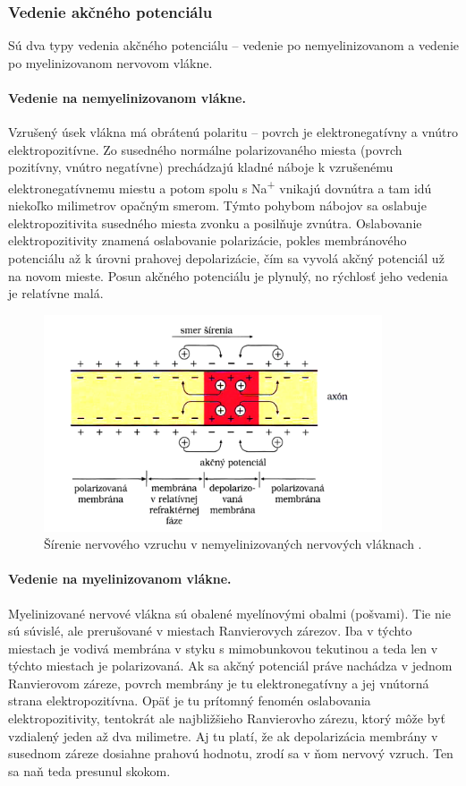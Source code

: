 \subsubsection{Vedenie akčného potenciálu}

Sú dva typy vedenia akčného potenciálu {--} vedenie po nemyelinizovanom a vedenie po myelinizovanom nervovom vlákne.

\paragraph{Vedenie na nemyelinizovanom vlákne.} 
Vzrušený úsek vlákna má obrátenú polaritu {--} povrch je elektronegatívny a vnútro elektropozitívne. Zo susedného normálne polarizovaného miesta (povrch pozitívny, vnútro negatívne) prechádzajú
kladné náboje k vzrušenému elektronegatívnemu miestu a potom spolu s Na\textsuperscript{+} vnikajú dovnútra a tam idú niekoľko milimetrov opačným smerom. Týmto pohybom nábojov sa oslabuje 
elektropozitivita susedného miesta zvonku a posilňuje zvnútra. Oslabovanie elektropozitivity znamená oslabovanie polarizácie, pokles membránového potenciálu až k úrovni prahovej depolarizácie,
čím sa vyvolá akčný potenciál už na novom mieste. Posun akčného potenciálu je plynulý, no rýchlosť jeho vedenia je relatívne malá.

\begin{figure}[!htbp]
  \centering
  \includegraphics[width=10cm]{img/nemyelin-clr.png}
  \caption{Šírenie nervového vzruchu v nemyelinizovaných nervových vláknach \cite{javorkaLekarskaFyziologiaUcebnica2001}.}
  \label{nemyelin}
\end{figure}

\paragraph{Vedenie na myelinizovanom vlákne.}
Myelinizované nervové vlákna sú obalené myelínovými obalmi (pošvami). Tie nie sú súvislé, ale prerušované v miestach Ranvierovych zárezov. Iba v týchto miestach je vodivá membrána v styku s mimobunkovou 
tekutinou a teda len v týchto miestach je polarizovaná. Ak sa akčný potenciál práve nachádza v jednom Ranvierovom záreze, povrch membrány je tu elektronegatívny a jej vnútorná strana 
elektropozitívna. Opäť je tu prítomný fenomén oslabovania elektropozitivity, tentokrát ale najbližšieho Ranvierovho zárezu, ktorý môže byť vzdialený jeden až dva milimetre. Aj tu platí, že ak
depolarizácia membrány v susednom záreze dosiahne prahovú hodnotu, zrodí sa v ňom nervový vzruch. Ten sa naň teda presunul skokom. 

